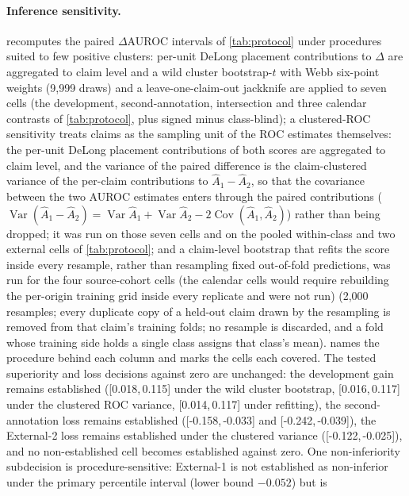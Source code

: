 \documentclass[11pt]{article}
\newcommand{\ci}[2]{[#1,\,#2]}
\begin{document}
\paragraph{Inference sensitivity.}  recomputes the paired $\Delta$AUROC intervals
of \cref{tab:protocol} under procedures suited to few positive clusters: per-unit DeLong placement
contributions to $\Delta$ are aggregated to claim level and a wild cluster bootstrap-$t$ with Webb
six-point weights (9{,}999 draws) and a leave-one-claim-out jackknife are applied to seven cells
(the development, second-annotation, intersection and three calendar contrasts of
\cref{tab:protocol}, plus signed minus class-blind); a clustered-ROC sensitivity treats claims as
the sampling unit of the ROC estimates themselves: the per-unit DeLong placement contributions
of both scores are aggregated to claim level, and the variance of the paired difference is the
claim-clustered variance of the per-claim contributions to $\hat A_1-\hat A_2$, so that the
covariance between the two AUROC estimates enters through the paired contributions
($\operatorname{Var}(\hat A_1-\hat A_2)=\operatorname{Var}\hat A_1+\operatorname{Var}\hat A_2-2\operatorname{Cov}(\hat A_1,\hat A_2)$)
rather than being dropped; it was run on those seven cells and on the pooled within-class and
two external cells of \cref{tab:protocol}; and a claim-level bootstrap that refits the score inside
every resample, rather than resampling fixed out-of-fold predictions, was run for the four
source-cohort cells (the calendar cells would require rebuilding the per-origin training grid
inside every replicate and were not run)
(2{,}000 resamples; every duplicate copy of a held-out claim drawn by the resampling is removed
from that claim's training folds; no resample is discarded, and a fold whose training side holds a
single class assigns that class's mean).  names the
procedure behind each column and marks the cells each covered. The tested superiority and loss
decisions against zero are unchanged: the development gain remains established
(\ci{0.018}{0.115} under the wild cluster bootstrap, \ci{0.016}{0.117} under the clustered ROC
variance, \ci{0.014}{0.117} under refitting), the second-annotation loss remains established
(\ci{-0.158}{-0.033} and \ci{-0.242}{-0.039}), the External-2 loss remains established under the
clustered variance (\ci{-0.122}{-0.025}), and no non-established cell becomes established
against zero. One non-inferiority subdecision is procedure-sensitive: External-1 is not
established as non-inferior under the primary percentile interval (lower bound $-0.052$) but is
\end{document}
